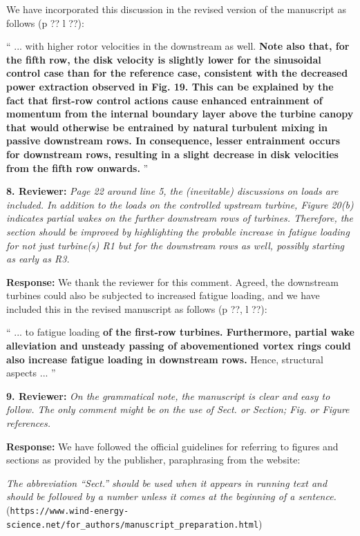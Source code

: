 \documentclass[]{article}
\begin{document}
We have incorporated this discussion in the revised version of the manuscript as follows (p ?? l ??): 

``
... with higher rotor velocities in the downstream as well.  \textbf{Note also that, for the fifth row, the disk velocity is slightly lower for the sinusoidal control case than for the reference case, consistent with the decreased power extraction observed in Fig. 19. This can be explained by the fact that first-row control actions cause enhanced entrainment of momentum from the internal boundary layer above the turbine canopy that would otherwise be entrained by natural turbulent mixing in passive downstream rows. In consequence, lesser entrainment occurs for downstream rows, resulting in a slight decrease in disk velocities from the fifth row onwards.}
''

\dotfill

\textbf{8. Reviewer: } \textit{Page 22 around line 5, the (inevitable) discussions on loads are included. In addition
	to the loads on the controlled upstream turbine, Figure 20(b) indicates partial wakes
	on the further downstream rows of turbines. Therefore, the section should be improved
	by highlighting the probable increase in fatigue loading for not just turbine(s) R1 but for
	the downstream rows as well, possibly starting as early as R3.}

\textbf{Response: } We thank the reviewer for this comment. Agreed, the downstream turbines could also be subjected to increased fatigue loading, and we have included this in the revised manuscript as follows (p ??, l ??):

``
... to fatigue loading \textbf{of the first-row turbines. Furthermore, partial wake alleviation and unsteady passing of abovementioned vortex rings could also increase fatigue loading in downstream rows.} Hence, structural aspects ...
''

\dotfill

\textbf{9. Reviewer: } \textit{On the grammatical note, the manuscript is clear and easy to follow. The only comment
	might be on the use of Sect. or Section; Fig. or Figure references.}

\textbf{Response: } We have followed the official guidelines for referring to figures and sections as provided by the publisher, paraphrasing from the website:\

\emph{The abbreviation ``Sect.'' should be used when it appears in running text and should be followed by a number unless it comes at the beginning of a sentence.}\\({\small \verb|https://www.wind-energy-science.net/for_authors/manuscript_preparation.html|})
\end{document}
